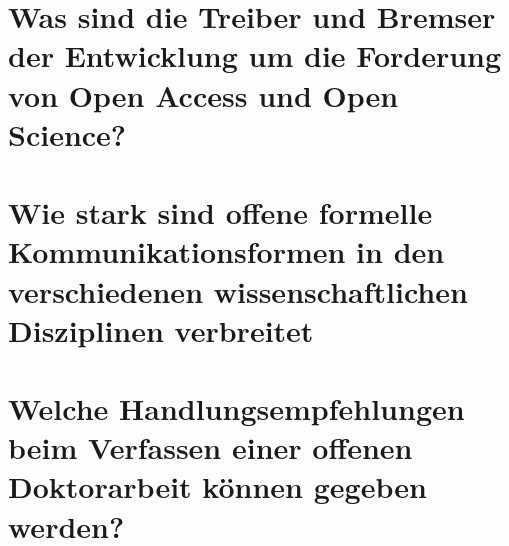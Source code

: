 \section{Was sind die Treiber und Bremser der Entwicklung um die Forderung von Open Access und Open Science?} 

\section{Wie stark sind offene formelle Kommunikationsformen in den verschiedenen wissenschaftlichen Disziplinen verbreitet}  
 
\section{Welche Handlungsempfehlungen beim Verfassen einer offenen Doktorarbeit können gegeben werden?} 